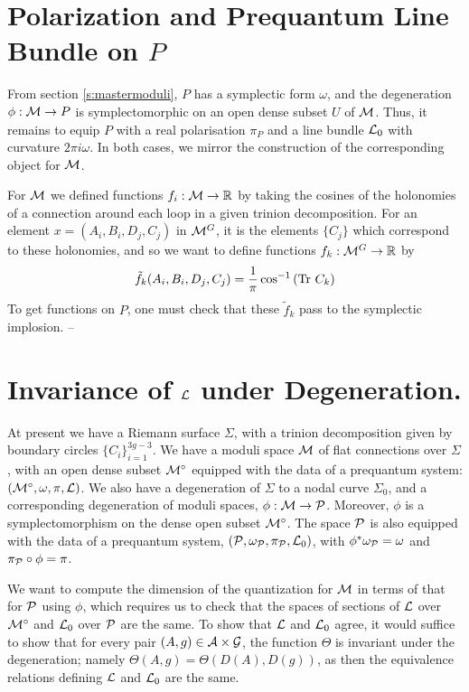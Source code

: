 \section{Polarization and Prequantum Line Bundle on $P$}
	From section \ref{s:mastermoduli}, $P$ has a symplectic form $\omega$, and the degeneration $\phi:\mathcal{M}\to P$ is symplectomorphic on an open dense subset $U$ of $\mathcal{M}$. Thus, it remains to equip $P$ with a real polarisation $\pi_P$ and a line bundle $\mathcal{L}_0$ with curvature $2\pi i \omega$. In both cases, we mirror the construction of the corresponding object for $\mathcal{M}$.
	
	For $\mathcal{M}$ we defined functions $f_i:\mathcal{M}\to \mathbb{R}$ by taking the cosines of the holonomies of a connection around each loop in a given trinion decomposition. For an element $x=(A_i,B_i,D_j,C_j)$ in $\mathcal{M}^G$, it is the elements $\{C_j\}$ which correspond to these holonomies, and so we want to define functions $f_k:\mathcal{M}^G \to \mathbb{R}$ by 
	\begin{equation}
		\tilde{f}_k(A_i,B_i,D_j,C_j) = \frac{1}{\pi}\cos^{-1} \left(\text{Tr } C_k\right)
	\end{equation}
	To get functions on $P$, one must check that these $\tilde{f}_k$ pass to the symplectic implosion. -- 

\section{Invariance of $\mathcal{L}$ under Degeneration.}
	At present we have a Riemann surface $\Sigma$, with a trinion decomposition given by boundary circles $\{C_i\}_{i=1}^{3g-3}$. We have a moduli space $\mathcal{M}$ of flat connections over $\Sigma$, with an open dense subset $\mathcal{M}^\circ$ equipped with the data of a prequantum system: $(\mathcal{M}^\circ, \omega, \pi, \mathcal{L})$. We also have a degeneration of $\Sigma$ to a nodal curve $\Sigma_0$, and a corresponding degeneration of moduli spaces, $\phi:\mathcal{M}\to \mathcal{P}$. Moreover, $\phi$ is a symplectomorphism on the dense open subset $\mathcal{M}^\circ$. The space $\mathcal{P}$ is also equipped with the data of a prequantum system, $(\mathcal{P}, \omega_{\mathcal{P}}, \pi_{\mathcal{P}}, \mathcal{L}_0)$, with $\phi^\ast \omega_{\mathcal{P}} = \omega$ and $\pi_{\mathcal{P}}\circ\phi = \pi$. 
	
	We want to compute the dimension of the quantization for $\mathcal{M}$ in terms of that for $\mathcal{P}$ using $\phi$, which requires us to check that the spaces of sections of $\mathcal{L}$ over $\mathcal{M}^\circ$ and $\mathcal{L}_0$ over $\mathcal{P}$ are the same. To show that $\mathcal{L}$ and $\mathcal{L}_0$ agree, it would suffice to show that for every pair $(A,g)\in \mathcal{A}\times \mathcal{G}$, the function $\Theta$ is invariant under the degeneration; namely $\Theta(A,g) = \Theta(D(A), D(g))$, as then the equivalence relations defining $\mathcal{L}$ and $\mathcal{L}_0$ are the same.
	
